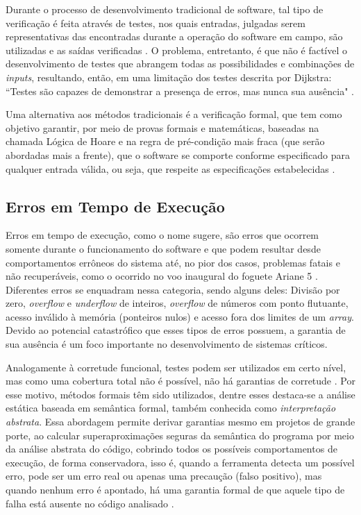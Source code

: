 \documentclass{article}
\begin{document}
     Durante o processo de desenvolvimento tradicional de software, tal tipo de verificação é feita através de testes, nos quais entradas, julgadas serem representativas das encontradas durante a operação do software em campo, são utilizadas e as saídas verificadas \cite{blanchard2020introduction}. O problema, entretanto, é que não é factível o desenvolvimento de testes que abrangem todas as possibilidades e combinações de \emph{inputs}, resultando, então, em uma limitação dos testes descrita por Dijkstra: ``Testes são capazes de demonstrar a presença de erros, mas nunca sua ausência" \cite{dijkstra1970ewd249}.
     
    Uma alternativa aos métodos tradicionais é a verificação formal, que tem como objetivo garantir, por meio de provas formais e matemáticas, baseadas na chamada Lógica de Hoare e na regra de pré-condição mais fraca (que serão abordadas mais a frente), que o software se comporte conforme especificado para qualquer entrada válida, ou seja, que respeite as especificações estabelecidas \cite{blanchard2020introduction}. 


\subsection{Erros em Tempo de Execução}
    Erros em tempo de execução, como o nome sugere, são erros que ocorrem somente durante o funcionamento do software e que podem resultar desde comportamentos errôneos do sistema até, no pior dos casos, problemas fatais e não recuperáveis, como o ocorrido no voo inaugural do foguete Ariane 5 \cite{ariane_5_report}. 
    Diferentes erros se enquadram nessa categoria, sendo alguns deles: Divisão por zero, \emph{overflow} e \emph{underflow} de inteiros, \emph{overflow} de números com ponto flutuante, acesso inválido à memória (ponteiros nulos) e acesso fora dos limites de um \emph{array}.
    Devido ao potencial catastrófico que esses tipos de erros possuem, a garantia  de sua ausência é um foco importante no desenvolvimento de sistemas críticos. 
    
    Analogamente à corretude funcional, testes podem ser utilizados em certo nível, mas como uma cobertura total não é possível, não há garantias de corretude \cite{kaestner2010astree}. Por esse motivo, métodos formais têm sido utilizados, dentre esses destaca-se a análise estática baseada em semântica formal, também conhecida como \textit{interpretação abstrata}. Essa abordagem permite derivar garantias mesmo em projetos de grande porte, ao calcular superaproximações seguras da semântica do programa por meio da análise  abstrata do código, cobrindo todos os possíveis comportamentos de execução, de forma conservadora, isso é, quando a ferramenta detecta um possível erro, pode ser um erro real ou apenas uma precaução (falso positivo), mas quando nenhum erro é apontado, há uma garantia formal de que aquele tipo de falha está ausente no código analisado \cite{kaestner2010astree}.
    
\end{document}
